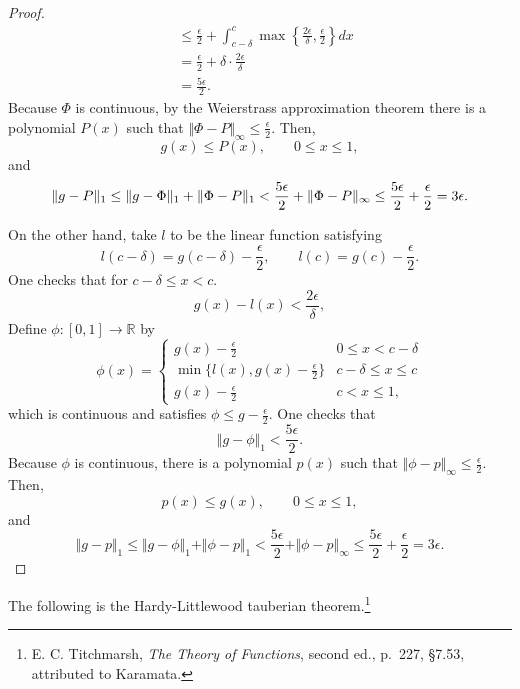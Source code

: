 \documentclass{article}
\newcommand{\norm}[1]{\Vert #1 \Vert}
\theoremstyle{definition}
\begin{document}
\begin{proof}
\begin{align*}
&\leq  \frac{\epsilon}{2}+\int_{c-\delta}^c \max\left\{\frac{2\epsilon}{\delta},\frac{\epsilon}{2}\right\} dx\\
&= \frac{\epsilon}{2}+\delta \cdot \frac{2\epsilon}{\delta}\\
&=\frac{5\epsilon}{2}.
\end{align*}
Because $\Phi$ is continuous, by the Weierstrass approximation theorem there is a polynomial $P(x)$
such that $\norm{\Phi-P}_\infty \leq \frac{\epsilon}{2}$. Then,
\[
g(x) \leq P(x), \qquad 0 \leq x \leq 1,
\]
and
\[
\norm{g-P}_1 \leq \norm{g-\Phi}_1 + \norm{\Phi-P}_1
< \frac{5\epsilon}{2}+\norm{\Phi-P}_\infty\\
\leq \frac{5\epsilon}{2}+\frac{\epsilon}{2}
=3\epsilon.
\]

On the other hand, take $l$ to be the linear function satisfying
\[
l(c-\delta)=g(c-\delta) - \frac{\epsilon}{2}, \qquad l(c)=g(c)-\frac{\epsilon}{2}.
\]
One checks that for $c-\delta \leq x < c$.
\[
g(x)-l(x) < \frac{2\epsilon}{\delta},
\] 
Define $\phi:[0,1] \to \mathbb{R}$ by
\[
\phi(x)=\begin{cases}
g(x)-\frac{\epsilon}{2}&0 \leq x < c-\delta\\
\min\{l(x),g(x)-\frac{\epsilon}{2}\}&c-\delta \leq x \leq c\\
g(x)-\frac{\epsilon}{2}&c<x\leq 1,
\end{cases}
\]
which is continuous and satisfies $\phi \leq g-\frac{\epsilon}{2}$.
One checks that
\[
\norm{g-\phi}_1  < \frac{5\epsilon}{2}.
\]
Because $\phi$ is continuous, there is a polynomial $p(x)$ such that
$\norm{\phi-p}_\infty \leq \frac{\epsilon}{2}$. Then,
\[
p(x) \leq g(x), \qquad 0 \leq x \leq 1,
\]
and
\[
\norm{g-p}_1 \leq \norm{g-\phi}_1 + \norm{\phi-p}_1
<\frac{5\epsilon}{2}+\norm{\phi-p}_\infty
\leq \frac{5\epsilon}{2}+\frac{\epsilon}{2}
=3\epsilon. 
\]
\end{proof}


The following is the Hardy-Littlewood tauberian theorem.\footnote{E. C. Titchmarsh, {\em The Theory of Functions}, second ed., p.~227, \S 7.53, attributed to Karamata.}
\end{document}
